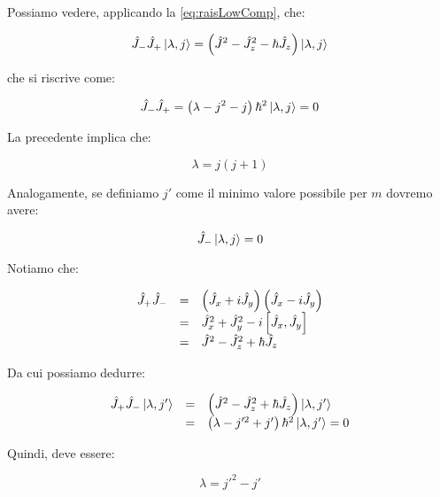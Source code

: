 Possiamo vedere, applicando la \eqref{eq:raisLowComp}, che:

	\begin{equation}
		\hat{J}_- \hat{J}_+ \ket{\lambda, j} = \left ( \hat{J}^2 - \hat{J}_z^2 - \hbar \hat{J}_z \right ) \ket{\lambda, j}
	\end{equation}

che si riscrive come:

	\begin{equation}
		\hat{J}_- \hat{J}_+ = \left( \lambda - j^2 - j \right ) \hbar^2 \ket{\lambda, j} = 0
	\end{equation}

La precedente implica che:

	\begin{equation} \label{eq:lambdaVinc1}
		\lambda = j ( j + 1 )
	\end{equation}

Analogamente, se definiamo $j'$ come il minimo valore possibile per $m$ dovremo avere:

	\begin{equation}
		\hat{J}_- \ket{\lambda, j} = 0
	\end{equation}

Notiamo che:

	\begin{equation}
		\begin{array}{c c l}
			\hat{J}_+ \hat{J}_- & = & \left ( \hat{J}_x + i \hat{J}_y \right ) \left ( \hat{J}_x - i \hat{J}_y \right ) \\
			& = & \hat{J}^2_x + \hat{J}^2_y - i \left [ \hat{J}_x, \hat{J}_y \right ] \\
			& = & \hat{J}^2 - \hat{J}^2_z + \hbar \hat{J}_z
		\end{array}
	\end{equation}

Da cui possiamo dedurre:

	\begin{equation}
		\begin{array}{c c l}
			\hat{J}_+ \hat{J}_- \ket{\lambda, j'} & = & \left ( \hat{J}^2 - \hat{J}_z^2 + \hbar \hat{J}_z \right ) \ket{\lambda, j'}\\

		& = & \left ( \lambda - j'^2 + j' \right ) \hbar^2 \ket{\lambda, j'} = 0
		\end{array}
	\end{equation}

Quindi, deve essere:

	\begin{equation} \label{eq:lambdaVinc2}
		\lambda  = j'^2 - j'
	\end{equation}

